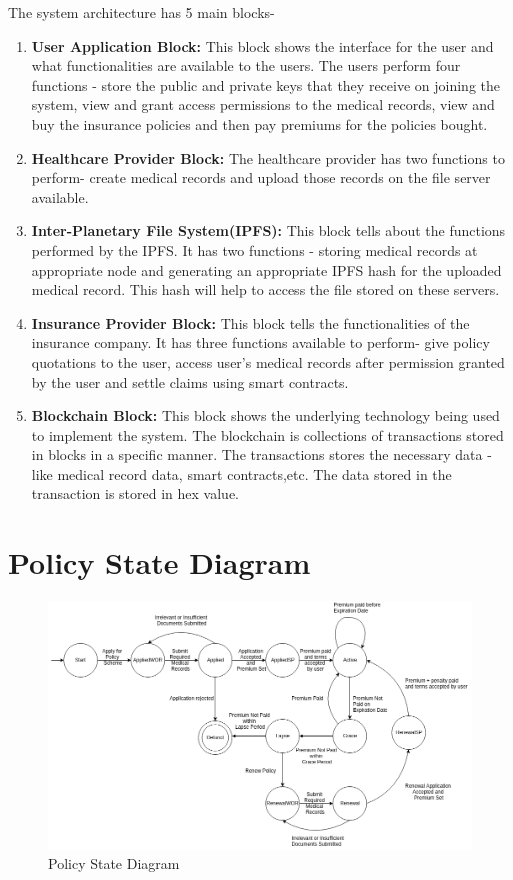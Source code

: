 The system architecture has 5 main blocks-
\begin{enumerate}
	\item 	\textbf{User Application Block:} This block shows the interface for the user and what functionalities are available to the users. The users perform four functions - store the public and private keys that they receive on joining the system, view and grant access permissions to the medical records, view and buy the insurance policies and then pay premiums for the policies bought.
	\\
	\item \textbf{Healthcare Provider Block:} The healthcare provider has two functions to perform- create medical records and upload those records on the file server available.
	\item \textbf{Inter-Planetary File System(IPFS):} This block tells about the functions performed by the IPFS. It has two functions - storing medical records at appropriate node and generating an appropriate IPFS hash for the uploaded medical record. This hash will help to access the file stored on these servers.
	\item \textbf{Insurance Provider Block:} This block tells the functionalities of the insurance company. It has three functions available to perform- give policy quotations to the user, access user’s medical records after permission granted by the user and settle claims using smart contracts.
	\item \textbf{Blockchain Block:} This block shows the underlying technology being used to implement the system. The blockchain is collections of transactions stored in blocks in a specific manner. The transactions stores the necessary data - like medical record data, smart contracts,etc. The data stored in the transaction is stored in hex value.
\end{enumerate}

\section{Policy State Diagram}
\begin{figure}[!h]
	\centering
	\includegraphics[width=\linewidth]{Images/PolicyStateDiagram.png}
	\caption{Policy State Diagram}
\end{figure} 

